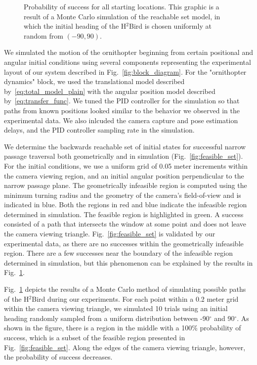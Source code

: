 \documentclass{aamas2013}
\begin{document}
\begin{figure}[tb]
\begin{minipage}[b]{0.45\linewidth}
\caption{Probability of success for all starting locations. This graphic is 
a result of a Monte Carlo simulation of the reachable set model, in which the 
initial heading of the H$^2$Bird is chosen uniformly at random from $(-90,90)$.}
\label{fig:heat_map}
\end{minipage}
\end{figure}

We simulated the motion of the ornithopter beginning from certain positional
and angular initial conditions using several components representing the
experimental layout of our system described in Fig.~\ref{fig:block_diagram}.
For the "ornithopter dynamics" block, we used the translational model
described by~\ref{eq:total_model_plain} with the angular position model
described by~\ref{eq:transfer_func}. We tuned the PID controller for the
simulation so that paths from known positions looked similar to the behavior
we observed in the experimental data. We also inlcuded the camera capture and
pose estimation delays, and the PID controller sampling rate in the
simulation.

We determine the backwards reachable set of initial states for successful
narrow passage traversal both geometrically and in simulation
(Fig.~\ref{fig:feasible_set}). For the initial conditions, we use a uniform
grid of 0.05 meter increments within the camera viewing region, and an initial
angular position perpendicular to the narrow passage plane. The geometrically
infeasible region is computed using the minimum turning radius and the
geometry of the camera's field-of-view and is indicated in blue. Both the
regions in red and blue indicate the infeasible region determined in
simulation. The feasible region is highlighted in green. A success consisted
of a path that intersects the window at some point and does not leave the
camera viewing triangle. Fig.~\ref{fig:feasible_set} is validated by our
experimental data, as there are no successes within the geometrically
infeasible region. There are a few successes near the boundary of the
infeasible region determined in simulation, but this phenomenon can be
explained by the results in Fig.~\ref{fig:heat_map}.

Fig.~\ref{fig:heat_map} depicts the results of a Monte Carlo method of
simulating possible paths of the H$^2$Bird during our experiments. For each
point within a 0.2 meter grid within the camera viewing triangle, we simulated
10 trials using an initial heading randomly sampled from a uniform
distribution between -90$^{\circ}$ and 90$^{\circ}$. As shown in the figure,
there is a region in the middle with a 100\% probability of success, which is
a subset of the feasible region presented in Fig.~\ref{fig:feasible_set}.
Along the edges of the camera viewing triangle, however, the probability of
success decreases.
\end{document}
